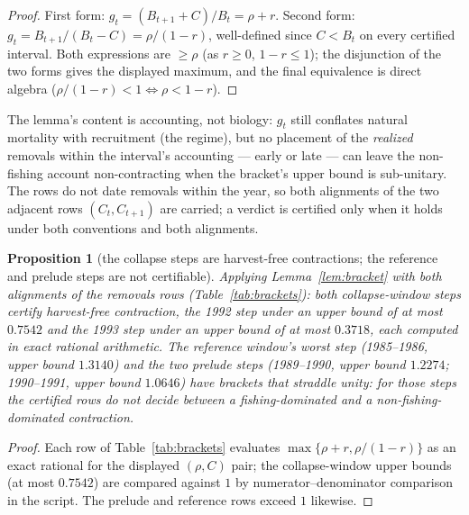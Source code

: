 \documentclass[10pt,twocolumn]{article}
\theoremstyle{plain}
\newtheorem{proposition}[theorem]{Proposition}
\theoremstyle{remark}
\begin{document}
\begin{proof}
First form: \(g_t = (B_{t+1} + C)/B_t = \rho + r\). Second form:
\(g_t = B_{t+1}/(B_t - C) = \rho/(1 - r)\), well-defined since
\(C < B_t\) on every certified interval. Both expressions are
\(\ge \rho\) (as \(r \ge 0\), \(1 - r \le 1\)); the disjunction of the
two forms gives the displayed maximum, and the final equivalence is
direct algebra (\(\rho/(1-r) < 1 \iff \rho < 1 - r\)).
\end{proof}

The lemma's content is accounting, not biology: \(g_t\) still conflates
natural mortality with recruitment (the regime), but no placement of
the \emph{realized} removals within the interval's accounting --- early
or late --- can leave the non-fishing account non-contracting when the
bracket's upper bound is sub-unitary. The rows do not date removals
within the year, so both alignments of the two adjacent rows
\((C_t, C_{t+1})\) are carried; a verdict is certified only when it
holds under both conventions and both alignments.

\begin{proposition}[the collapse steps are harvest-free contractions;
the reference and prelude steps are not certifiable]
\label{prop:brackets}
Applying Lemma~\ref{lem:bracket} with both alignments of the removals
rows (Table~\ref{tab:brackets}): both collapse-window steps certify
harvest-free contraction, the 1992 step under an upper bound of at
most \(0.7542\) and the 1993 step under an upper bound of at most
\(0.3718\), each computed in exact rational arithmetic. The reference
window's worst step (1985--1986, upper bound \(1.3140\)) and the two
prelude steps (1989--1990, upper bound \(1.2274\); 1990--1991, upper
bound \(1.0646\)) have brackets that straddle unity: for those steps
the certified rows do not decide between a fishing-dominated and a
non-fishing-dominated contraction.
\end{proposition}

\begin{proof}
Each row of Table~\ref{tab:brackets} evaluates
\(\max\{\rho + r, \rho/(1-r)\}\) as an exact rational for the displayed
\((\rho, C)\) pair; the collapse-window upper bounds (at most
\(0.7542\)) are compared against \(1\) by
numerator--denominator comparison in the script. The prelude and
reference rows exceed \(1\) likewise.
\end{proof}
\end{document}
